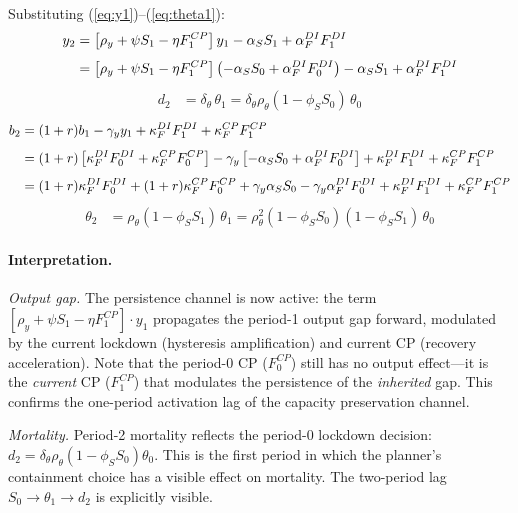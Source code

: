 \documentclass[12pt, a4paper]{article}
\begin{document}
Substituting (\ref{eq:y1})--(\ref{eq:theta1}):
%
\begin{align}
    y_2 &= \left[\rho_y + \psi S_1 - \eta F_1^{CP}\right] y_1
      - \alpha_S S_1 + \alpha_F^{DI} F_1^{DI}
    \notag \\[4pt]
    &= \left[\rho_y + \psi S_1 - \eta F_1^{CP}\right]
      \left(-\alpha_S S_0 + \alpha_F^{DI} F_0^{DI}\right)
      - \alpha_S S_1 + \alpha_F^{DI} F_1^{DI}
    \label{eq:y2}
\end{align}
%
\begin{align}
    d_2 &= \delta_\theta \, \theta_1
      = \delta_\theta \rho_\theta (1 - \phi_S S_0) \, \theta_0
    \label{eq:d2}
\end{align}
%
\begin{align}
    b_2 &= (1+r) b_1 - \gamma_y y_1
      + \kappa_F^{DI} F_1^{DI} + \kappa_F^{CP} F_1^{CP}
    \notag \\[4pt]
    &= (1+r)\left[\kappa_F^{DI} F_0^{DI} + \kappa_F^{CP} F_0^{CP}\right]
      - \gamma_y \left[-\alpha_S S_0 + \alpha_F^{DI} F_0^{DI}\right]
      + \kappa_F^{DI} F_1^{DI} + \kappa_F^{CP} F_1^{CP}
    \notag \\[4pt]
    &= (1+r)\kappa_F^{DI} F_0^{DI} + (1+r)\kappa_F^{CP} F_0^{CP}
      + \gamma_y \alpha_S S_0 - \gamma_y \alpha_F^{DI} F_0^{DI}
      + \kappa_F^{DI} F_1^{DI} + \kappa_F^{CP} F_1^{CP}
    \label{eq:b2}
\end{align}
%
\begin{align}
    \theta_2 &= \rho_\theta(1 - \phi_S S_1) \, \theta_1
      = \rho_\theta^2 (1 - \phi_S S_0)(1 - \phi_S S_1) \, \theta_0
    \label{eq:theta2}
\end{align}

\paragraph{Interpretation.}

\textit{Output gap.} The persistence channel is now active: the term $[\rho_y + \psi S_1 - \eta F_1^{CP}] \cdot y_1$ propagates the period-1 output gap forward, modulated by the current lockdown (hysteresis amplification) and current CP (recovery acceleration). Note that the period-0 CP ($F_0^{CP}$) still has no output effect---it is the \textit{current} CP ($F_1^{CP}$) that modulates the persistence of the \textit{inherited} gap. This confirms the one-period activation lag of the capacity preservation channel.

\textit{Mortality.} Period-2 mortality reflects the period-0 lockdown decision: $d_2 = \delta_\theta \rho_\theta (1 - \phi_S S_0) \theta_0$. This is the first period in which the planner's containment choice has a visible effect on mortality. The two-period lag $S_0 \to \theta_1 \to d_2$ is explicitly visible.
\end{document}
